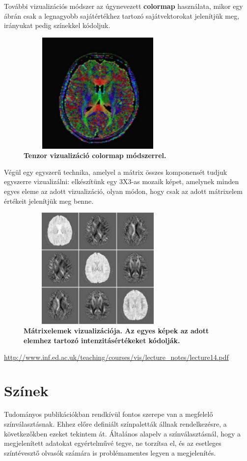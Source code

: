 \documentclass[12pt]{article}
\theoremstyle{plain}
\begin{document}
  További vizualizációs módszer az úgynevezett \textbf{colormap} használata, mikor egy ábrán csak a legnagyobb sajátértékhez tartozó sajátvektorokat jelenítjük meg, irányukat pedig színekkel kódoljuk. 
 
  \begin{figure}[H]
    \centering
    \includegraphics[width=8cm, height=6cm]{media/colormap.PNG}
    \caption{\textbf{Tenzor vizualizáció colormap módszerrel.}}
    \label{fig:GeneralDiagram}
 \end{figure}
 
 Végül egy egyszerű technika, amelyel a mátrix összes komponensét tudjuk egyszerre vizualizálni: elkészítünk egy 3X3-as mozaik képet, amelynek minden egyes eleme az adott vizualizáció, olyan módon, hogy csak az adott mátrixelem értékeit jelenítjük meg benne.
 
 \begin{figure}[H]
    \centering
    \includegraphics[width=8cm, height=6cm]{media/brain.PNG}
    \caption{\textbf{Mátrixelemek vizualizációja. Az egyes képek az adott elemhez tartozó intenzitásértékeket kódolják.}}
    \label{fig:GeneralDiagram}
 \end{figure}

 \url{http://www.inf.ed.ac.uk/teaching/courses/vis/lecture_notes/lecture14.pdf}
 
 \section{Színek}
 Tudományos publikációkban rendkívül fontos szerepe van a megfelelő színválasztásnak. Ehhez előre definiált színpaletták állnak rendelkezésre, a következőkben ezeket tekintem át. Általános alapelv a színválasztásnál, hogy a megjelenített adatokat egyértelművé tegye, ne torzítsa el, és az esetleges színtévesztő olvasók számára is problémamentes legyen a megjelenítés.
 
\end{document}
